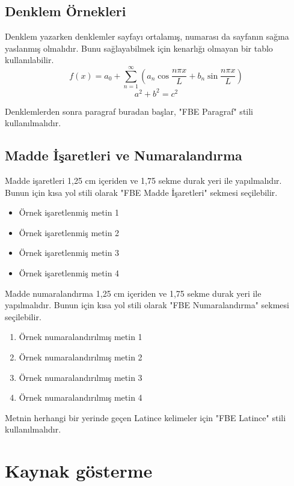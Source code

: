 \subsection{Denklem Örnekleri}
\noindent Denklem yazarken denklemler sayfayı ortalamış, numarası da sayfanın sağına yaslanmış olmalıdır. Bunu sağlayabilmek için kenarlığı olmayan bir tablo kullanılabilir.
\begin{equation}
f(x)=a_0+\sum_{n=1}^{\infty}\left(a_n\cos\frac{n\pi x}{L}+b_n\sin\frac{n\pi x}{L}\right)
\end{equation}
\begin{equation}
a^2+b^2=c^2
\end{equation}

Denklemlerden sonra paragraf buradan başlar, "FBE Paragraf" stili kullanılmalıdır.






\subsection{Madde İşaretleri ve Numaralandırma}
\noindent Madde işaretleri 1,25 cm içeriden ve 1,75 sekme durak yeri ile yapılmalıdır. Bunun için kısa yol stili olarak "FBE Madde İşaretleri" sekmesi seçilebilir.
\begin{itemize}
	\setlength{\itemindent}{1.25cm}
	\item Örnek işaretlenmiş metin 1
    \item Örnek işaretlenmiş metin 2
     \item Örnek işaretlenmiş metin 3
     \item Örnek işaretlenmiş metin 4
\end{itemize}

Madde numaralandırma 1,25 cm içeriden ve 1,75 sekme durak yeri ile yapılmalıdır. Bunun için kısa yol stili olarak "FBE Numaralandırma" sekmesi seçilebilir.
\begin{enumerate}
	\setlength{\itemindent}{1.25cm}
	\item Örnek numaralandırılmış metin 1
	\item Örnek numaralandırılmış metin 2
	\item Örnek numaralandırılmış metin 3
	\item Örnek numaralandırılmış metin 4
\end{enumerate}

Metnin herhangi bir yerinde geçen Latince kelimeler için "FBE Latince" stili kullanılmalıdır.


\section{Kaynak gösterme}

